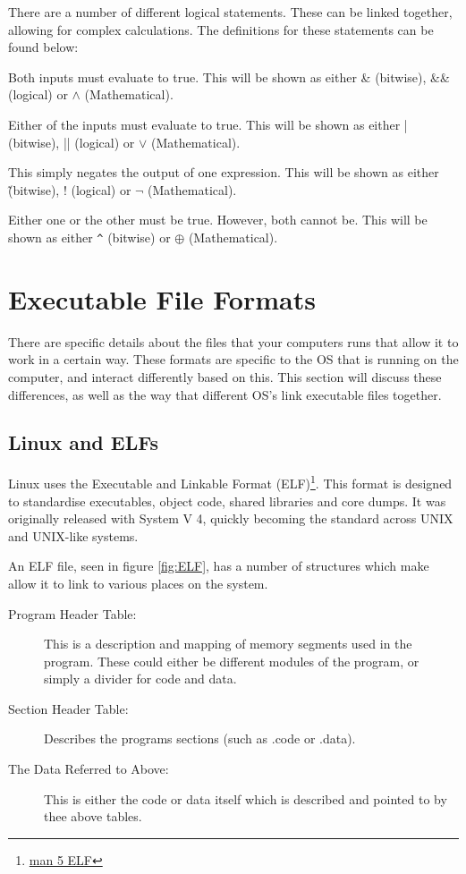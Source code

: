 		There are a number of different logical statements.
		These can be linked together, allowing for complex calculations.
		The definitions for these statements can be found below:
			\begin{description}
				\item[AND] Both inputs must evaluate to true.
					This will be shown as either \& (bitwise), \&\& (logical) or $\wedge$ (Mathematical).
				\item[OR] Either of the inputs must evaluate to true.
					This will be shown as either | (bitwise), || (logical) or $\vee$ (Mathematical).
				\item[NOT] This simply negates the output of one expression.
					This will be shown as either \~ (bitwise), ! (logical) or $\neg$ (Mathematical).
				\item[XOR] Either one or the other must be true. However, both cannot be.
				This will be shown as either \verb+^+ (bitwise) or $\oplus$ (Mathematical).
			\end{description}

	\section{Executable File Formats}
		There are specific details about the files that your computers runs that allow it to work in a certain way.
		These formats are specific to the OS that is running on the computer,
		and interact differently based on this.
		This section will discuss these differences, as well as the way that different OS's link executable files together.

		\subsection{Linux and ELFs}
		\index{ELF}
			Linux uses the Executable and Linkable Format (ELF)\footnote{\href{http://linux.die.net/man/5/elf}{man 5 ELF}}.
			This format is designed to standardise executables, object code, shared libraries and core dumps.
			It was originally released with System V 4, quickly becoming the standard across UNIX and UNIX-like systems.

			An ELF file, seen in figure \ref{fig:ELF}, has a number of structures which make allow it to link to various places on the system.
			\begin{description}
				\item[Program Header Table:] This is a description and mapping of memory segments used in the program.
					These could either be different modules of the program, or simply a divider for code and data.
				\item[Section Header Table:] Describes the programs sections (such as .code or .data).
				\item[The Data Referred to Above:] This is either the code or data itself which is described
					and pointed to by thee above tables.
			\end{description}

